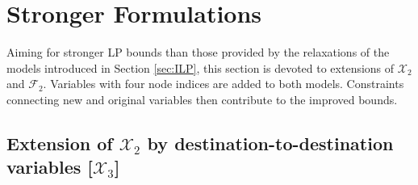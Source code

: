 \section{Stronger Formulations}
\label{sec:strong}

Aiming for stronger LP bounds than those provided by the relaxations of the models introduced in Section \ref{sec:ILP},
this section is devoted to extensions of $\mathcal{X}_2$ and $\mathcal{F}_2$.
Variables with four node indices are added to both models.
Constraints connecting new and original variables then contribute to the improved bounds.

\subsection{Extension of $\mathcal{X}_2$ by destination-to-destination variables [$\mathcal{X}_3$]}
\label{sec:smtx3}

